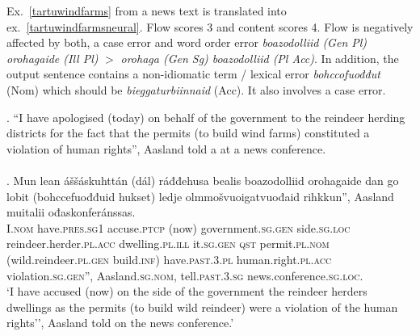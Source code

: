 \documentclass{flammie}
\begin{document}
Ex.~\ref{tartuwindfarms} from a news text is translated into
ex.~\ref{tartuwindfarmsneural}. Flow scores 3 and content scores 4.  Flow is
negatively affected by both, a case error and word order error
\textit{boazodolliid (Gen Pl) orohagaide (Ill Pl)} $>$ \textit{orohaga (Gen Sg)
boazodolliid (Pl Acc)}.  In addition, the output sentence contains a
non-idiomatic term / lexical error \textit{bohccofuođđut} (Nom) which should be
\textit{bieggaturbiinnaid} (Acc). It also involves a case error.


\ex. ``I have apologised (today) on behalf of the government to the reindeer
herding districts for the fact that the permits (to build wind farms)
constituted a violation of human rights'', Aasland told a at a news
conference.\label{tartuwindfarms}\\
\\



\exg. Mun lean áššáskuhttán (dál) ráđđehusa bealis boazodolliid orohagaide dan
go lobit (bohccefuođđuid hukset) ledje olmmošvuoigatvuođaid rihkkun'', Aasland
muitalii ođaskonferánssas.\label{tartuwindfarmsneural}\\
I\textsc{.nom} have\textsc{.pres.sg1} accuse\textsc{.ptcp} (now)
government\textsc{.sg.gen} side\textsc{.sg.loc} reindeer.herder\textsc{.pl.acc}
dwelling\textsc{.pl.ill} it\textsc{.sg.gen} \textsc{qst} permit\textsc{.pl.nom}
(wild.reindeer\textsc{.pl.gen} build\textsc{.inf}) have\textsc{.past.3.pl}
human.right\textsc{.pl.acc} violation\textsc{.sg.gen}'', Aasland\textsc{.sg.nom},
tell\textsc{.past.3.sg} news.conference\textsc{.sg.loc}. \\
`I have accused (now) on the side of the government the reindeer herders
dwellings as the permits (to build wild reindeer) were a violation of the human
rights'', Aasland told on the news conference.'
\end{document}

